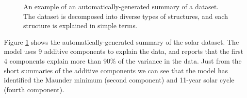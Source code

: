 \documentclass{article}
\begin{document}
\begin{figure}[h]
\centering
{}
\caption{
An example of an automatically-generated summary of a dataset.  The dataset is decomposed into diverse types of structures, and each structure is explained in simple terms.}
\label{fig:exec}
\end{figure}


Figure \ref{fig:exec} shows the automatically-generated summary of the solar dataset.
The model uses 9 additive components to explain the data, and reports that the first 4 components explain more than 90\% of the variance in the data.
Just from the short summaries of the additive components we can see that the model has identified the Maunder minimum (second component) and 11-year solar cycle (fourth component).
\end{document}
